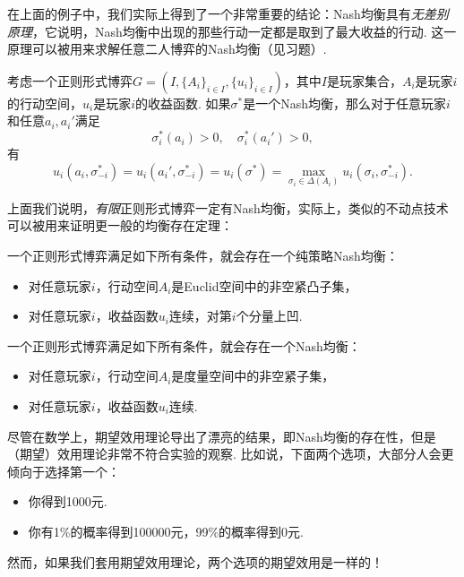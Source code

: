 在上面的例子中，我们实际上得到了一个非常重要的结论：Nash均衡具有\textit{无差别原理}，它说明，Nash均衡中出现的那些行动一定都是取到了最大收益的行动. 这一原理可以被用来求解任意二人博弈的Nash均衡（见习题）.

\begin{theorem}[无差别原理]\label{thm:indifference-principle}
考虑一个正则形式博弈$G=(I,\{A_i\}_{i\in I},\{u_i\}_{i\in I})$，其中$I$是玩家集合，$A_i$是玩家$i$的行动空间，$u_i$是玩家$i$的收益函数. 如果$\sigma^*$是一个Nash均衡，那么对于任意玩家$i$和任意$a_i,a_i'$满足
\[\sigma^*_i(a_i)>0,\quad \sigma^*_i(a_i')>0,\]
有
\[u_i(a_i,\sigma^*_{-i})=u_i(a_i',\sigma^*_{-i})=u_i(\sigma^*)=\max_{\sigma_i\in\Delta(A_i)}u_i(\sigma_i,\sigma^*_{-i}).\]
\end{theorem}

上面我们说明，\textit{有限}正则形式博弈一定有Nash均衡，实际上，类似的不动点技术可以被用来证明更一般的均衡存在定理：

\begin{theorem}
    一个正则形式博弈满足如下所有条件，就会存在一个纯策略Nash均衡： 
    \begin{itemize}
        \item 对任意玩家$i$，行动空间$A_i$是Euclid空间中的非空紧凸子集，
        \item 对任意玩家$i$，收益函数$u_i$连续，对第$i$个分量上凹. 
    \end{itemize}
\end{theorem}

\begin{theorem}[Glicksberg定理]
    一个正则形式博弈满足如下所有条件，就会存在一个Nash均衡：
    \begin{itemize}
        \item 对任意玩家$i$，行动空间$A_i$是度量空间中的非空紧子集，
        \item 对任意玩家$i$，收益函数$u_i$连续. 
    \end{itemize}
\end{theorem}

尽管在数学上，期望效用理论导出了漂亮的结果，即Nash均衡的存在性，但是（期望）效用理论非常不符合实验的观察. 比如说，下面两个选项，大部分人会更倾向于选择第一个：
\begin{itemize}
    \item 你得到1000元.
    \item 你有1\%的概率得到100000元，99\%的概率得到0元.
\end{itemize}
然而，如果我们套用期望效用理论，两个选项的期望效用是一样的！

